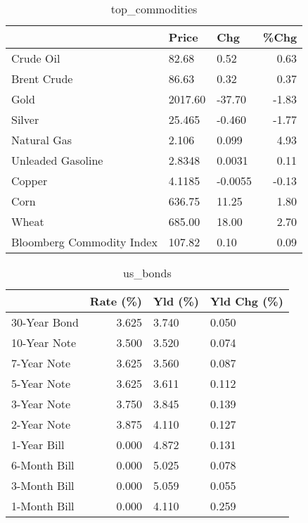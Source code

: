 \documentclass{article}%
\begin{document}
\begin{table}[htbp]%
\caption{top\_commodities}%
\centering%
\begin{adjustbox}{width=1\textwidth}%
\begin{tabular}{lllr}
\toprule
                          &   Price &     Chg &  \%Chg \\
\midrule
               Crude Oil  &   82.68 &    0.52 &  0.63 \\
             Brent Crude  &   86.63 &    0.32 &  0.37 \\
                    Gold  & 2017.60 &  -37.70 & -1.83 \\
                  Silver  &  25.465 &  -0.460 & -1.77 \\
             Natural Gas  &   2.106 &   0.099 &  4.93 \\
       Unleaded Gasoline  &  2.8348 &  0.0031 &  0.11 \\
                  Copper  &  4.1185 & -0.0055 & -0.13 \\
                    Corn  &  636.75 &   11.25 &  1.80 \\
                   Wheat  &  685.00 &   18.00 &  2.70 \\
Bloomberg Commodity Index &  107.82 &    0.10 &  0.09 \\
\bottomrule
\end{tabular}
%
\end{adjustbox}%
\end{table}

%


\begin{table}[htbp]%
\caption{us\_bonds}%
\centering%
\begin{adjustbox}{width=1\textwidth}%
\begin{tabular}{lrll}
\toprule
             &  Rate (\%) & Yld (\%) & Yld Chg (\%) \\
\midrule
30-Year Bond &     3.625 &   3.740 &       0.050 \\
10-Year Note &     3.500 &   3.520 &       0.074 \\
 7-Year Note &     3.625 &   3.560 &       0.087 \\
 5-Year Note &     3.625 &   3.611 &       0.112 \\
 3-Year Note &     3.750 &   3.845 &       0.139 \\
 2-Year Note &     3.875 &   4.110 &       0.127 \\
 1-Year Bill &     0.000 &   4.872 &       0.131 \\
6-Month Bill &     0.000 &   5.025 &       0.078 \\
3-Month Bill &     0.000 &   5.059 &       0.055 \\
1-Month Bill &     0.000 &   4.110 &       0.259 \\
\bottomrule
\end{tabular}
%
\end{adjustbox}%
\end{table}
\end{document}
